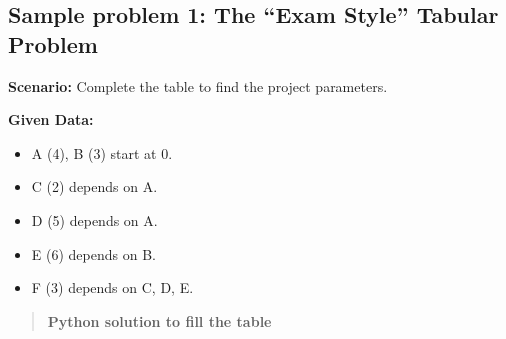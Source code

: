 \documentclass[
  letterpaper,
  DIV=11,
  numbers=noendperiod]{scrreprt}
\providecommand{\tightlist}{%
  \setlength{\itemsep}{0pt}\setlength{\parskip}{0pt}}
\begin{document}
\subsection{Sample problem 1: The ``Exam Style'' Tabular
Problem}\label{sample-problem-1-the-exam-style-tabular-problem}

\textbf{Scenario:} Complete the table to find the project parameters.

\textbf{Given Data:}

\begin{itemize}
\tightlist
\item
  A (4), B (3) start at 0.
\item
  C (2) depends on A.
\item
  D (5) depends on A.
\item
  E (6) depends on B.
\item
  F (3) depends on C, D, E.
\end{itemize}

\begin{quote}
\textbf{Python solution to fill the table}
\end{quote}
\end{document}
